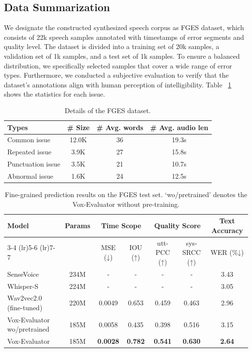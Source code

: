 \documentclass[letterpaper]{article} %
\begin{document}
\subsection{Data Summarization}
We designate the constructed synthesized speech corpus as FGES dataset, which consists of 22k speech samples annotated with timestamps of error segments and quality level. The dataset is divided into a training set of 20k samples, a validation set of 1k samples, and a test set of 1k samples. To ensure a balanced distribution, we specifically selected samples that cover a wide range of error types. Furthermore, we conducted a subjective evaluation to verify that the dataset's annotations align with human perception of intelligibility.
Table ~\ref{tab:datasets} shows the statistics for each issue. 

\begin{table}[!t]
    \centering
    \small
    \begin{tabular}{lccc}
    \toprule
    Types & \# Size & \# Avg. words & \# Avg. audio len \\
    \midrule
    Common issue & 12.0K & 36 & 19.3s \\
    Repeated issue & 3.9K & 27 & 15.8s \\
    Punctuation issue & 3.5K  & 21 & 10.7s \\
    Abnormal issue & 1.6K & 24 & 12.5s \\
    \bottomrule
\end{tabular}
\caption{Details of the FGES dataset.}
\label{tab:datasets}
\end{table}


\begin{table}[t]
\centering
\small
\renewcommand{\arraystretch}{1.2}
\setlength{\tabcolsep}{3.5pt}
\begin{tabular}{lcccccc} 
\toprule
\multirow{2}{*}{\textbf{Model}} & \multirow{2}{*}{\textbf{Params}} & \multicolumn{2}{c}{\textbf{Time Scope}} & \multicolumn{2}{c}{\textbf{Quality Score}} & \multicolumn{1}{c}{\textbf{Text Accuracy}} \\
\cmidrule(lr){3-4} \cmidrule(lr){5-6} \cmidrule(lr){7-7} 
& & {MSE (↓)} & {IOU (↑)} & {utt-PCC (↑)} & {sys-SRCC (↑)} & {WER (\%↓)} \\
\midrule
SenseVoice & 234M & - & - & - & - & 3.43 \\
Whisper-S & 224M & - & - & - & - & 3.05 \\
Wav2vec2.0 (fine-tuned) & 220M & 0.0049 & 0.653 & 0.459 & 0.463 & 2.96 \\
\midrule
Vox-Evaluator wo/pretrained & 185M & 0.0058 & 0.435 & 0.398 & 0.516 & 3.15 \\
Vox-Evaluator & 185M & \textbf{0.0028} & \textbf{0.782} & \textbf{0.541} & \textbf{0.630} & \textbf{2.64} \\
\bottomrule
\end{tabular}
\caption{Fine-grained prediction results on the FGES test set. `wo/pretrained' denotes the Vox-Evaluator without pre-training.}
\label{tab:prediction}
\end{table}
\end{document}
